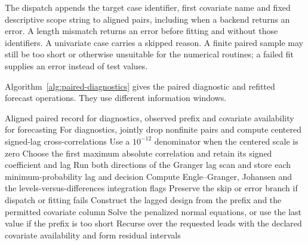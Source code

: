 The dispatch appends the target case identifier, first covariate name and fixed descriptive scope string to aligned pairs, including when a backend returns an error. A length mismatch returns an error before fitting and without those identifiers. A univariate case carries a skipped reason. A finite paired sample may still be too short or otherwise unsuitable for the numerical routines; a failed fit supplies an error instead of test values.

Algorithm~\ref{alg:paired-diagnostics} gives the paired diagnostic
and refitted forecast operations. They use different information
windows.
\begin{algorithm}[htbp]
\caption{Compute retrospective paired diagnostics and construct the separately scored blind and covariate-aware ridge forecasts.}
\label{alg:paired-diagnostics}
\begin{algorithmic}[1]
\Require Aligned paired record for diagnostics, observed prefix and covariate availability for forecasting
\State For diagnostics, jointly drop nonfinite pairs and compute centered signed-lag cross-correlations
\State Use a $10^{-12}$ denominator when the centered scale is zero
\State Choose the first maximum absolute correlation and retain its signed coefficient and lag
\State Run both directions of the Granger lag scan and store each minimum-probability lag and decision
\State Compute Engle--Granger, Johansen and the levels-versus-differences integration flags
\State Preserve the skip or error branch if dispatch or fitting fails
  \State Construct the lagged design from the prefix and the permitted covariate column
  \State Solve the penalized normal equations, or use the last value if the prefix is too short
  \State Recurse over the requested leads with the declared covariate availability and form residual intervals
\EndFor
\end{algorithmic}
\end{algorithm}

